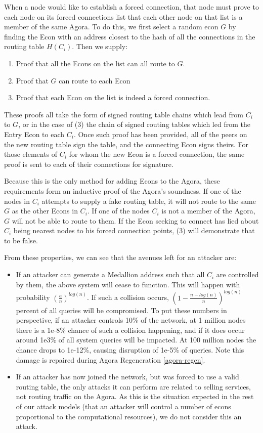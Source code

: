 \documentclass{article}
\begin{document}
When a node would like to establish a forced connection, that node must prove to each node on its forced connections list that each other node on that list is a member of the same Agora. To do this, we first select a random econ $G$ by finding the Econ with an address closest to the hash of all the connections in the routing table $H(C_i)$. Then we supply:

\begin{enumerate}
    \item Proof that all the Econs on the list can all route to $G$.
    \item Proof that $G$ can route to each Econ
    \item Proof that each Econ on the list is indeed a forced connection.
\end{enumerate}

These proofs all take the form of signed routing table chains which lead from $C_i$ to $G$, or in the case of (3) the chain of signed routing tables which led from the Entry Econ to each $C_i$. Once such proof has been provided, all of the peers on the new routing table sign the table, and the connecting Econ signs theirs. For those elements of $C_i$ for whom the new Econ is a forced connection, the same proof is sent to each of their connections for signature.

Because this is the only method for adding Econs to the Agora, these requirements form an inductive proof of the Agora's soundness. If one of the nodes in $C_i$ attempts to supply a fake routing table, it will not route to the same $G$ as the other Econs in $C_i$. If one of the nodes $C_i$ is not a member of the Agora, $G$ will not be able to route to them. If the Econ seeking to connect has lied about $C_i$ being nearest nodes to his forced connection points, (3) will demonstrate that to be false.

From these properties, we can see that the avenues left for an attacker are:

\begin{itemize}
    \item If an attacker can generate a Medallion address such that all $C_i$ are controlled by them, the above system will cease to function. This will happen with probability $(\frac{a}{n})^{log(n)}$. If such a collision occurs, $(1 - \frac{n-log(n)}{n})^{log(n)}$ percent of all queries will be compromised. To put these numbers in perspective, if an attacker controls 10\% of the network, at 1 million nodes there is a 1e-8\% chance of such a collision happening, and if it does occur around 1e3\% of all system queries will be impacted. At 100 million nodes the chance drops to 1e-12\%, causing disruption of 1e-5\% of queries. Note this damage is repaired during Agora Regeneration \ref{agora-regen}.
    \item If an attacker has now joined the network, but was forced to use a valid routing table, the only attacks it can perform are related to selling services, not routing traffic on the Agora. As this is the situation expected in the rest of our attack models (that an attacker will control a number of econs proportional to the computational resources), we do not consider this an attack.
\end{itemize}
\end{document}
